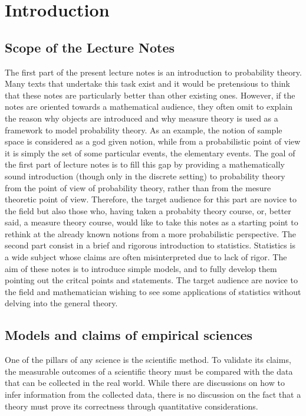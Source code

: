 
\section{Introduction}


\subsection{ Scope of the Lecture Notes}

	The first part of the present lecture notes is an introduction to probability theory. Many texts that undertake this task exist and it would be pretensious to think that these notes are particularly better than other existing ones. However, if the notes are oriented towards a mathematical audience, they often omit to explain the reason why objects are introduced and why measure theory is used as a framework to model probability theory. As an example, the notion of sample space is considered as a god given notion, while from a probabilistic point of view it is simply the set of some particular events, the elementary events. The goal of the first part of lecture notes is to fill this gap by providing a mathematically sound introduction (though only in the discrete setting) to probability theory from the point of view of probability theory, rather than from the mesure theoretic point of view. Therefore, the target audience for this part are novice to the field  but also those who, having taken a probabity theory course, or, better said, a measure theory course, would like to take this notes as a starting point to rethink at the already known notions from a more probabilistic perspective.  
	The second part consist in a brief and rigorous introduction to statistics. Statistics is a wide subject whose claims are often misinterpreted due to lack of rigor. The aim of these notes is to introduce simple models, and to fully develop them pointing out the critcal points and statements. The target audience are novice to the field and mathematician wishing to see some applications of statistics without delving into the general theory.   

\subsection{ Models and claims of empirical sciences}
	\label{ss:probability_motivation}
	One of the pillars of any science is the scientific method. To validate its claims, the measurable outcomes of a scientific theory must be compared with the data that can be collected in the real world. While there are discussions on how to infer information from the collected data, there is no discussion on the fact that a theory must prove its correctness through quantitative considerations.\\

